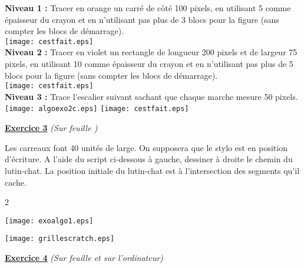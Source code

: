 \documentclass[a4paper,11pt]{article}
\newcommand{\bmul}[1]{\begin{multicols}{#1}}
\newcommand{\emul}{\end{multicols}}
\begin{document}
\vspace*{0.4cm}

\textbf{Niveau 1 :} Tracer en orange un carré de côté 100 pixels, en utilisant 5 comme épaisseur du crayon et en n'utilisant pas plus de 3 blocs pour la figure (sans compter les blocs de démarrage).\\


\texttt{[image: cestfait.eps]} \\

\textbf{Niveau 2 :} Tracer en violet un rectangle de longueur 200 pixels et de largeur 75 pixels, en utilisant 10 comme épaisseur du crayon et en n'utilisant pas plus de 5 blocs pour la figure (sans compter les blocs de démarrage).\\

\texttt{[image: cestfait.eps]} \\

\textbf{Niveau 3 :} Trace l'escalier suivant sachant que chaque marche 
mesure 50 pixels.\\

\texttt{[image: algoexo2c.eps]} \hfill\texttt{[image: cestfait.eps]} \\

\newpage

\begin{center}
\textbf{{\large \underline{Exercice 3}}} \textit{(Sur feuille )}
\end{center}



Les carreaux font 40 unités de large. On supposera que le stylo est en position d'écriture. A l'aide du script ci-dessous à gauche, dessiner à droite le chemin du lutin-chat. La position initiale du lutin-chat est à l'intersection des segments qu'il cache.

\bmul{2}

\texttt{[image: exoalgo1.eps]} \\

\columnbreak

\vspace*{1cm}

\texttt{[image: grillescratch.eps]} \\

\emul



\begin{center}
\textbf{{\large \underline{Exercice 4}}} \textit{(Sur feuille et sur l'ordinateur)}
\end{center}
\end{document}
